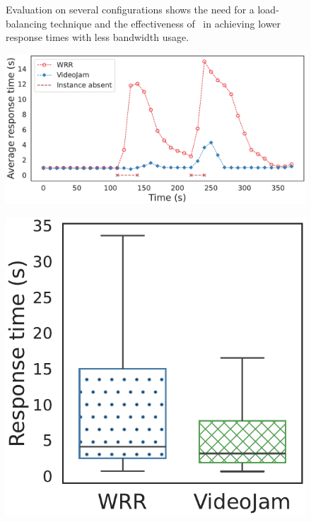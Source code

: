 \begin{figure}[htb]
\begin{minipage}[t]{.3\linewidth}
		\label{fig:against_wrr_bandwidth}
	\end{minipage}
	\vspace{-1mm}
	\caption{Evaluation on several configurations shows the need for a load-balancing technique and the effectiveness of~\videojam{} in achieving lower response times with less bandwidth usage.}
	\vspace{-3mm}
	\label{fig:against_wrr}
\end{figure}

\begin{figure}[htb]
	\centering
	\begin{minipage}[t]{.66\linewidth}
		\centering
		\includegraphics[width=\linewidth]{chapters/videojam/images/adaptability/average_response_time_timeseries.pdf}
		\label{fig:adaptability_avg_response_time}
	\end{minipage}
	\begin{minipage}[t]{.32\linewidth}
		\centering
		\includegraphics[width=\linewidth]{chapters/videojam/images/adaptability/response_time.pdf}

\end{minipage}
\end{figure}
